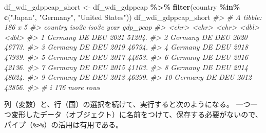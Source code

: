 \documentclass[
  xelatex, ja=standard]{bxjsbook}
\newenvironment{Shaded}{\begin{snugshade}}{\end{snugshade}}
\newcommand{\CommentTok}[1]{\textcolor[rgb]{0.56,0.35,0.01}{\textit{#1}}}
\newcommand{\FunctionTok}[1]{\textcolor[rgb]{0.13,0.29,0.53}{\textbf{#1}}}
\newcommand{\NormalTok}[1]{#1}
\newcommand{\OtherTok}[1]{\textcolor[rgb]{0.56,0.35,0.01}{#1}}
\newcommand{\SpecialCharTok}[1]{\textcolor[rgb]{0.81,0.36,0.00}{\textbf{#1}}}
\newcommand{\StringTok}[1]{\textcolor[rgb]{0.31,0.60,0.02}{#1}}
\theoremstyle{definition}
\theoremstyle{definition}
\theoremstyle{definition}
\theoremstyle{definition}
\theoremstyle{remark}
\begin{document}
\begin{Shaded}
\begin{Highlighting}[]
\NormalTok{df\_wdi\_gdppcap\_short }\OtherTok{\textless{}{-}}\NormalTok{ df\_wdi\_gdppcap }\SpecialCharTok{\%\textgreater{}\%} 
  \FunctionTok{filter}\NormalTok{(country }\SpecialCharTok{\%in\%} \FunctionTok{c}\NormalTok{(}\StringTok{"Japan"}\NormalTok{, }\StringTok{"Germany"}\NormalTok{, }\StringTok{"United States"}\NormalTok{))}
\NormalTok{df\_wdi\_gdppcap\_short}
\CommentTok{\#\textgreater{} \# A tibble: 186 x 5}
\CommentTok{\#\textgreater{}    country iso2c iso3c  year gdp\_pcap}
\CommentTok{\#\textgreater{}    \textless{}chr\textgreater{}   \textless{}chr\textgreater{} \textless{}chr\textgreater{} \textless{}dbl\textgreater{}    \textless{}dbl\textgreater{}}
\CommentTok{\#\textgreater{}  1 Germany DE    DEU    2021   51204.}
\CommentTok{\#\textgreater{}  2 Germany DE    DEU    2020   46773.}
\CommentTok{\#\textgreater{}  3 Germany DE    DEU    2019   46794.}
\CommentTok{\#\textgreater{}  4 Germany DE    DEU    2018   47939.}
\CommentTok{\#\textgreater{}  5 Germany DE    DEU    2017   44653.}
\CommentTok{\#\textgreater{}  6 Germany DE    DEU    2016   42136.}
\CommentTok{\#\textgreater{}  7 Germany DE    DEU    2015   41103.}
\CommentTok{\#\textgreater{}  8 Germany DE    DEU    2014   48024.}
\CommentTok{\#\textgreater{}  9 Germany DE    DEU    2013   46299.}
\CommentTok{\#\textgreater{} 10 Germany DE    DEU    2012   43856.}
\CommentTok{\#\textgreater{} \# i 176 more rows}
\end{Highlighting}
\end{Shaded}

列（変数）と、行（国）の選択を続けて、実行すると次のようになる。 一つ一つ変形したデータ（オブジェクト）に名前をつけて、保存する必要がないので、パイプ（\texttt{\%\textgreater{}\%}）の活用は有用である。
\end{document}
